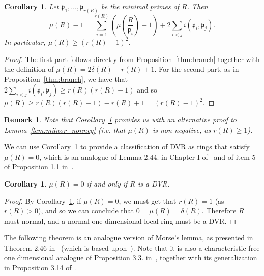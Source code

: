 \documentclass{article}
\newtheorem{remark}[theorem]{Remark}
\newtheorem{corollary}[theorem]{Corollary}
\numberwithin{theorem}{section}
\begin{document}
\begin{corollary}\label{cor:lower_bound}
    Let $\mathfrak{p}_1, \dots, \mathfrak{p}_{r(R)}$ be the minimal primes of $R$. Then 
    \begin{equation*}
        \mu(R) -1 = \sum_{i=1}^{r(R)} \left(\mu\left(\frac{R}{\mathfrak{p}_i}\right)-1\right) + 2\sum_{i <  j} i(\mathfrak{p}_i, \mathfrak{p}_j).
    \end{equation*}
    In particular, $\mu(R) \geq (r(R)-1)^2$. 
\end{corollary}

\begin{proof}
    The first part follows directly from Proposition~\ref{thm:branch} together with the definition of $\mu(R)=2\delta(R)-r(R)+1$. For the second part, as in Proposition~\ref{thm:branch}, we have that $2\sum_{i <  j} i(\mathfrak{p}_i, \mathfrak{p}_j) \geq r(R)(r(R)-1)$ and so $\mu(R) \geq r(R)(r(R)-1) - r(R) +1 = (r(R)-1)^2$.
\end{proof}


\begin{remark}
    \textup{Note that Corollary~\ref{cor:lower_bound} provides us with an alternative proof to Lemma~\ref{lem:milnor_nonneg} (i.e. that $\mu(R)$ is non-negative, as $r(R)\geq 1$). }
\end{remark}

We can use Corollary~\ref{cor:lower_bound} to provide a classification of DVR as rings that satisfy $\mu(R)=0$, which is an analogue of Lemma 2.44. in Chapter I of~\cite{greuel2007introduction} and of item 5 of Proposition 1.1 in~\cite{barroso2018milnor}. 

\begin{corollary}\label{cor:reg}
    $\mu(R)=0$ if and only if $R$ is a DVR. 
\end{corollary}
    

\begin{proof}
    By Corollary~\ref{cor:lower_bound}, if $\mu(R)=0$, we must get that $r(R)=1$ (as $r(R)>0$), and so we can conclude that $0=\mu(R)=\delta(R)$. Therefore $R$ must normal, and a normal one dimensional local ring must be a DVR. 
\end{proof}

The following theorem is an analogue version of Morse's lemma, as presented in Theorem 2.46 in~\cite{greuel2007introduction} (which is based upon~\cite{morse1934calculus, varchenko1985singularities}). Note that it is also a characteristic-free one dimensional analogue of Proposition 3.3. in~\cite{carvajal2019covers}, together with its generalization in Proposition 3.14 of~\cite{svoray2025ade}. 
\end{document}
